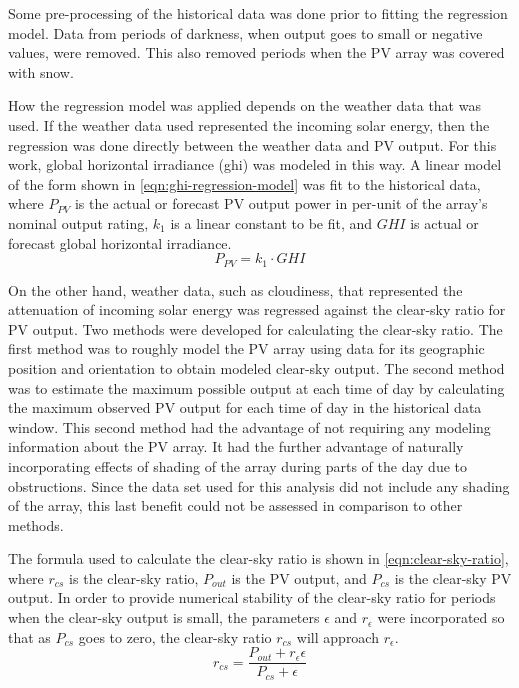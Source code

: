 Some pre-processing of the historical data was done prior to  fitting the regression model.
Data from periods of darkness, when output goes to small or negative values, were removed.
This also removed periods when the PV array was covered with snow.

How the regression model was applied depends on the weather data that was used.
If the weather data used represented the incoming solar energy, then the regression was done directly between the weather data and PV output.
For this work, global horizontal irradiance (ghi) was modeled in this way.
A linear model of the form shown in \cref{eqn:ghi-regression-model} was fit to the historical data, where
$P_{PV}$ is the actual or forecast PV output power in per-unit of the array's nominal output rating,
$k_1$ is a linear constant to be fit, and
$GHI$ is actual or forecast global horizontal irradiance.
%
\begin{equation}
	\label{eqn:ghi-regression-model}
	P_{PV} = k_1 \cdot GHI
\end{equation}

On the other hand, weather data, such as cloudiness, that represented the attenuation of incoming solar energy was regressed against the clear-sky ratio for PV output.
Two methods were developed for calculating the clear-sky ratio.
The first method was to roughly model the PV array using data for its geographic position and orientation to obtain modeled clear-sky output.
The second method was to estimate the maximum possible output at each time of day by calculating the maximum observed PV output for each time of day in the historical data window.
This second method had the advantage of not requiring any modeling information about the PV array.
It had the further advantage of naturally incorporating effects of shading of the array during parts of the day due to obstructions.
Since the data set used for this analysis did not include any shading of the array, this last benefit could not be assessed in comparison to other methods.

The formula used to calculate the clear-sky ratio is shown in \cref{eqn:clear-sky-ratio},
where $r_{cs}$ is the clear-sky ratio, $P_{out}$ is the PV output, and $P_{cs}$ is the clear-sky PV output.
In order to provide numerical stability of the clear-sky ratio for periods when the clear-sky output is small, the parameters $\epsilon$ and $r_\epsilon$ were incorporated so that as $P_{cs}$ goes to zero, the clear-sky ratio $r_{cs}$ will approach $r_\epsilon$.
%
\begin{equation}
	\label{eqn:clear-sky-ratio}
	r_{cs} = \frac{P_{out} + r_\epsilon \epsilon}{P_{cs} + \epsilon}
\end{equation}

